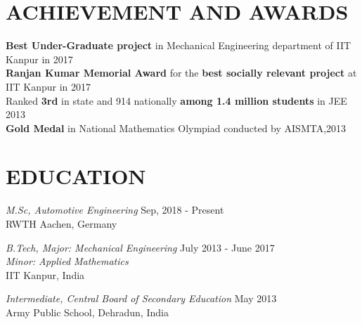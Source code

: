 \documentclass[margin, 10pt]{res} %
\begin{document}
\begin{resume}

\section{ACHIEVEMENT AND AWARDS} 


\textbf{Best Under-Graduate project} in Mechanical Engineering department of IIT Kanpur in 2017 \\
\textbf{Ranjan Kumar Memorial Award} for the \textbf{best socially relevant project} at IIT Kanpur in 2017\\
Ranked \textbf{3rd} in state and 914 nationally \textbf{among 1.4 million students} in JEE 2013\\
\textbf{Gold Medal} in National Mathematics Olympiad conducted by AISMTA,2013\\



\section{EDUCATION}

{\sl M.Sc, Automotive Engineering }%
\hfill Sep, 2018 - Present \\ 
RWTH Aachen, Germany

{\sl B.Tech, Major: Mechanical Engineering }%
  \hfill July 2013 - June 2017 \\ 
\phantom{x}\hspace{6.5ex} {\sl   Minor: Applied Mathematics}\\IIT Kanpur, India

 

 {\sl Intermediate, Central Board of Secondary Education} \hfill %
 \hfill May 2013 \\
Army Public School, Dehradun, India


 


\end{resume}
\end{document}

